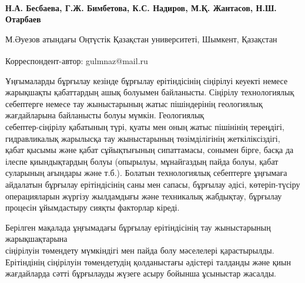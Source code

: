 
\begin{articleheader}

{\bfseries
Н.А. Бесбаева,
Г.Ж. Бимбетова\textsuperscript{\envelope },
К.С. Надиров,
М.Қ. Жантасов,
Н.Ш. Отарбаев
}
\end{articleheader}

\begin{affiliation}
М.Әуезов атындағы Оңтүстік Қазақстан университеті, Шымкент, Қазақстан

\raggedright \textsuperscript{\envelope }Корреспондент-автор: gulmnaz@mail.ru
\end{affiliation}

Ұңғымаларды бұрғылау кезінде бұрғылау ерітіндісінің сіңірілуі кеуекті
немесе жарықшақты қабаттардың ашық болуымен байланысты. Сіңірілу
технологиялық себептерге немесе тау жыныстарының жатыс пішіндерінің
геологиялық жағдайларына байланысты болуы мүмкін. Геологиялық\\
себептер-сіңірілу қабатының түрі, қуаты мен оның жатыс пішінінің
тереңдігі, гидравликалық жарылысқа тау жыныстарының төзімділігінің
жеткіліксіздігі, қабат қысымы және қабат сұйықтығының сипаттамасы,
сонымен бірге, басқа да ілеспе қиындықтардың болуы (опырылуы,
мұнайгаздың пайда болуы, қабат суларының ағындары және т.б.). Болатын
технологиялық себептерге ұңғымаға айдалатын бұрғылау ерітіндісінің саны
мен сапасы, бұрғылау әдісі, көтеріп-түсіру операцияларын жүргізу
жылдамдығы және техникалық жабдықтау, бұрғылау процесін ұйымдастыру
сияқты факторлар кіреді.

Берілген мақалада ұңғымадағы бұрғылау ерітіндісінің тау жыныстарының
жарықшақтарына \\сіңірілуін төмендету мүмкіндігі мен пайда болу мәселелері
қарастырылды. Ерітіндінің сіңірілуін төмендетудің қолданыстағы әдістері
талданды және қиын жағдайларда сәтті бұрғылауды жүзеге асыру бойынша
ұсыныстар жасалды.

